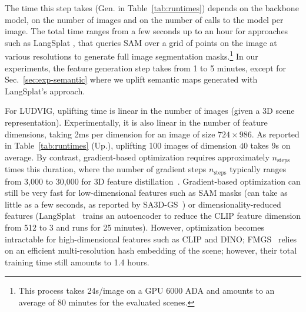  The time this step takes (Gen. in Table~\ref{tab:runtimes}) depends on the backbone model, on the number of images and on the number of calls to the model per image. The total time ranges from a few seconds up to an hour for approaches such as LangSplat \citep{qin2023langsplat}, that queries SAM over a grid of points on the image at various resolutions to generate full image segmentation masks.\footnote{This process takes 24s/image on a GPU 6000 ADA and amounts to an average of 80 minutes for the evaluated scenes.} In our experiments, the feature generation step takes from 1 to 5 minutes, except for Sec.~\ref{sec:exp-semantic} where we uplift semantic maps generated with LangSplat's approach.

 For LUDVIG, uplifting time is linear in the number of images (given a 3D scene representation). Experimentally, it is also linear in the number of feature dimensions, taking 2ms per dimension for an image of size $724 \times 986$. As reported in Table~\ref{tab:runtimes} (Up.), uplifting 100 images of dimension $40$ takes 9s on average. By contrast, gradient-based optimization requires approximately $n_{\text{steps}}$ times this duration, where the number of gradient steps $n_{\text{steps}}$ typically ranges from 3,000 to 30,000 for 3D feature distillation~\citep{kerr2023lerf, qin2023langsplat, zuo2024fmgs}. Gradient-based optimization can still be very fast for low-dimensional features such as SAM masks (can take as little as a few seconds, as reported by SA3D-GS~\citep{cen2023segmentGS}) or dimensionality-reduced features (LangSplat~\citep{qin2023langsplat} trains an autoencoder to reduce the CLIP feature dimension from 512 to 3 and runs for 25 minutes). However, optimization becomes intractable for high-dimensional features such as CLIP and DINO; FMGS~\citep{zuo2024fmgs} relies on an efficient multi-resolution hash embedding of the scene; however, their total training time still amounts to 1.4 hours.

